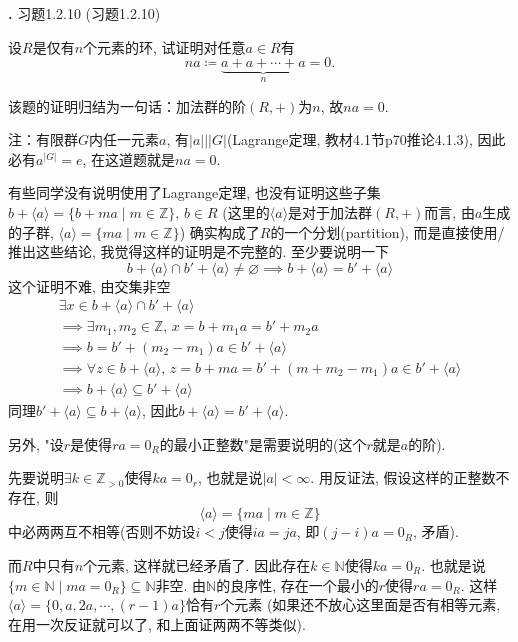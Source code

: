 \documentclass[UTF8,fontset=windows]{ctexart}
\newcommand{\defeq}{\mathrel{\coloneqq}}
\newcounter{problem}
\newenvironment{problem}[1][]
{
    \refstepcounter{problem}
    \noindent\textbf{\theproblem.}
    \ifx\relax#1\relax
    \else
        (#1)
    \fi
    \par\vspace{0.5em}
}
{\vspace{1em}}
\newenvironment{solution}
{\begin{tcolorbox}[colback=blue!10, colframe=blue!50, title=\textit{proof}, breakable]}
{\end{tcolorbox}}
\begin{document}
\begin{problem}[习题1.2.10]
    设$R$是仅有$n$个元素的环, 试证明对任意$a \in R$有
\[
    na \defeq \underbrace{a + a + \cdots + a}_n = 0.
\]
\end{problem}

\begin{solution}
    该题的证明归结为一句话：加法群的阶$(R, +)$为$n$, 故$na = 0$.

注：有限群$G$内任一元素$a$, 有$|a| \Big| |G|$(Lagrange定理, 教材4.1节p70推论4.1.3),
因此必有$a^{|G|} = e$, 在这道题就是$na = 0$.

有些同学没有说明使用了Lagrange定理, 也没有证明这些子集
$b + \langle a \rangle = \{b + ma \mid m \in \mathbb{Z}\},\, b \in R$
(这里的$\langle a \rangle$是对于加法群$(R, +)$而言, 由$a$生成的子群, $\langle a \rangle = \{ma \mid m \in \mathbb{Z}\}$)
确实构成了$R$的一个分划(partition), 而是直接使用/推出这些结论,
我觉得这样的证明是不完整的. 至少要说明一下
\[
    b + \langle a \rangle \cap b' + \langle a \rangle \neq \varnothing
    \implies b + \langle a \rangle = b' + \langle a \rangle
\]
这个证明不难, 由交集非空
\[
\begin{gathered}
    \exists x \in b + \langle a \rangle \cap b' + \langle a \rangle\\
    \implies \exists m_1, m_2 \in \mathbb{Z},\, x = b + m_1a = b' + m_2a\\
    \implies b = b' + (m_2 - m_1)a \in b' + \langle a \rangle\\
    \implies \forall z \in b + \langle a \rangle,\, z = b + ma = b' + (m + m_2 - m_1)a \in b' + \langle a \rangle\\
    \implies b + \langle a \rangle \subseteq b' + \langle a \rangle
\end{gathered} 
\]
同理$b' + \langle a \rangle \subseteq b + \langle a \rangle$,
因此$b + \langle a \rangle = b' + \langle a \rangle$.

另外, "设$r$是使得$ra = 0_R$的最小正整数"是需要说明的(这个$r$就是$a$的阶).

先要说明$\exists k \in \mathbb{Z}_{>0}$使得$ka = 0_r$, 也就是说$|a| < \infty$.
用反证法, 假设这样的正整数不存在, 则
\[
    \langle a \rangle = \{ma \mid m \in \mathbb{Z}\} 
\]
中必两两互不相等(否则不妨设$i < j$使得$ia = ja$, 即$(j - i)a = 0_R$, 矛盾).

而$R$中只有$n$个元素, 这样就已经矛盾了. 因此存在$k \in \mathbb{N}$使得$ka = 0_R$.
也就是说$\{m \in \mathbb{N} \mid ma = 0_R\} \subseteq \mathbb{N}$非空.
由$\mathbb{N}$的良序性, 存在一个最小的$r$使得$ra = 0_R$.
这样$\langle a \rangle = \{0, a, 2a, \cdots, (r - 1)a\}$恰有$r$个元素
(如果还不放心这里面是否有相等元素, 在用一次反证就可以了, 和上面证两两不等类似).
\end{solution}
\end{document}
